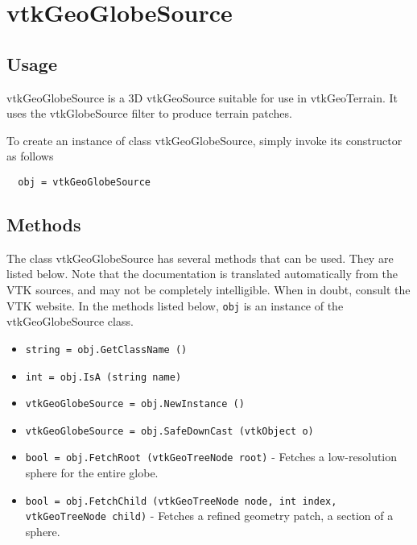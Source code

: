\section{vtkGeoGlobeSource}

\subsection{Usage}

 vtkGeoGlobeSource is a 3D vtkGeoSource suitable for use in vtkGeoTerrain.
 It uses the vtkGlobeSource filter to produce terrain patches.

To create an instance of class vtkGeoGlobeSource, simply
invoke its constructor as follows
\begin{verbatim}
  obj = vtkGeoGlobeSource
\end{verbatim}
\subsection{Methods}

The class vtkGeoGlobeSource has several methods that can be used.
  They are listed below.
Note that the documentation is translated automatically from the VTK sources,
and may not be completely intelligible.  When in doubt, consult the VTK website.
In the methods listed below, \verb|obj| is an instance of the vtkGeoGlobeSource class.
\begin{itemize}
\item  \verb|string = obj.GetClassName ()|

\item  \verb|int = obj.IsA (string name)|

\item  \verb|vtkGeoGlobeSource = obj.NewInstance ()|

\item  \verb|vtkGeoGlobeSource = obj.SafeDownCast (vtkObject o)|

\item  \verb|bool = obj.FetchRoot (vtkGeoTreeNode root)| -  Fetches a low-resolution sphere for the entire globe.

\item  \verb|bool = obj.FetchChild (vtkGeoTreeNode node, int index, vtkGeoTreeNode child)| -  Fetches a refined geometry patch, a section of a sphere.

\end{itemize}
